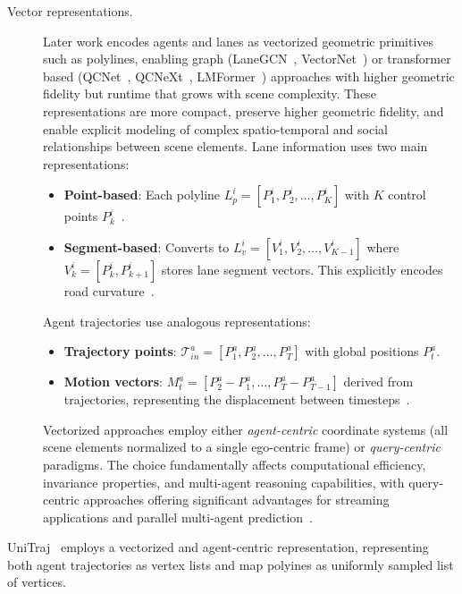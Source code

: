 \begin{description}
\item[Vector representations.] Later work encodes agents and lanes as vectorized geometric primitives such as polylines, enabling graph (LaneGCN~\cite{liang2020learning}, VectorNet~\cite{VectorNet2020}) or transformer based (QCNet~\cite{qcnetZhou2023}, QCNeXt~\cite{qcnextZhou2023}, LMFormer~\cite{lmformerYadav2025}) approaches with higher geometric fidelity but runtime that grows with scene complexity. These representations are more compact, preserve higher geometric fidelity, and enable explicit modeling of complex spatio-temporal and social relationships between scene elements. Lane information uses two main representations:
\begin{itemize}
  \item \textbf{Point-based}: Each polyline \(L_p^i = [P_1^i, P_2^i, \ldots, P_K^i]\) with \(K\) control points \(P_k^i\)~\cite{VectorNet2020, zhou2022hivt}.
  \item \textbf{Segment-based}: Converts to \(L_v^i = [V_1^i, V_2^i, \ldots, V_{K-1}^i]\) where \(V_{k}^i = [P_k^i, P_{k+1}^i]\) stores lane segment vectors. This explicitly encodes road curvature~\cite{liang2020learning,zhou2022hivt,qcnetZhou2023}.
\end{itemize}
Agent trajectories use analogous representations:
\begin{itemize}
  \item \textbf{Trajectory points}: \(\mathcal{T}_{in}^a = [P_1^a, P_2^a, \ldots, P_T^a]\) with global positions \(P_t^a\).
  \item \textbf{Motion vectors}: \(M_t^a = [P_{2}^a - P_{1}^a, \ldots, P_{T}^a - P_{T-1}^a]\) derived from trajectories, representing the displacement between timesteps~\cite{lmformerYadav2025}.
\end{itemize}
Vectorized approaches employ either \emph{agent-centric} coordinate systems (all scene elements normalized to a single ego-centric frame) or \emph{query-centric} paradigms. The choice fundamentally affects computational efficiency, invariance properties, and multi-agent reasoning capabilities, with query-centric approaches offering significant advantages for streaming applications and parallel multi-agent prediction~\cite{qcnetZhou2023}. %
\end{description}
UniTraj~\cite{unitrajFeng2024} employs a vectorized and agent-centric representation, representing both agent trajectories as vertex lists and map polyines as uniformly sampled list of vertices.

